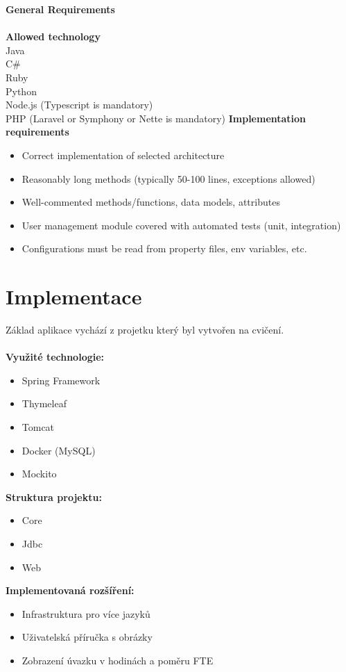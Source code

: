 \documentclass[czech,P5]{thesiskiv}
\begin{document}
{\large \textbf{General Requirements}}
\\\\
\textbf{Allowed technology} \\
Java \\
C\# \\
 Ruby \\
Python \\
Node.js (Typescript is mandatory) \\
PHP (Laravel or Symphony or Nette is mandatory)
\newpage
\textbf{Implementation requirements }
\begin{itemize}
             \item Correct implementation of selected architecture 
             \item Reasonably long methods (typically 50-100 lines, exceptions allowed) 
             \item Well-commented methods/functions, data models, attributes 
             \item User management module covered with automated tests (unit, integration) 
             \item Configurations must be read from property files, env variables, etc. 
\end{itemize}
 
\chapter{Implementace}
Základ aplikace vychází z projetku který byl vytvořen na cvičení.
\\\\
\textbf{Využité technologie:}
\begin{itemize}
             \item Spring Framework
             \item Thymeleaf
             \item Tomcat
             \item Docker (MySQL)
             \item Mockito
\end{itemize}
\textbf{Struktura projektu:}
\begin{itemize}
             \item Core
             \item Jdbc
             \item Web
\end{itemize}
\textbf{Implementovaná rozšíření:}
\begin{itemize}
             \item Infrastruktura pro více jazyků
             \item Uživatelská příručka s obrázky
             \item Zobrazení úvazku v hodinách a poměru FTE
\end{itemize}
\end{document}
